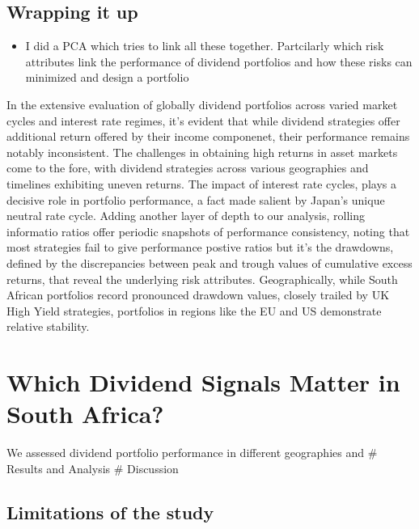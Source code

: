 \documentclass[11pt,preprint, authoryear]{elsarticle}
\numberwithin{equation}{section}
\numberwithin{figure}{section}
\numberwithin{table}{section}
\def\tightlist{} %
\begin{document}
\hypertarget{wrapping-it-up}{%
\subsection{Wrapping it up}\label{wrapping-it-up}}

\begin{itemize}
\tightlist
\item
  I did a PCA which tries to link all these together. Partcilarly which
  risk attributes link the performance of dividend portfolios and how
  these risks can minimized and design a portfolio
\end{itemize}

In the extensive evaluation of globally dividend portfolios across
varied market cycles and interest rate regimes, it's evident that while
dividend strategies offer additional return offered by their income
componenet, their performance remains notably inconsistent. The
challenges in obtaining high returns in asset markets come to the fore,
with dividend strategies across various geographies and timelines
exhibiting uneven returns. The impact of interest rate cycles, plays a
decisive role in portfolio performance, a fact made salient by Japan's
unique neutral rate cycle. Adding another layer of depth to our
analysis, rolling informatio ratios offer periodic snapshots of
performance consistency, noting that most strategies fail to give
performance postive ratios but it's the drawdowns, defined by the
discrepancies between peak and trough values of cumulative excess
returns, that reveal the underlying risk attributes. Geographically,
while South African portfolios record pronounced drawdown values,
closely trailed by UK High Yield strategies, portfolios in regions like
the EU and US demonstrate relative stability.

\hypertarget{which-dividend-signals-matter-in-south-africa}{%
\section{Which Dividend Signals Matter in South
Africa?}\label{which-dividend-signals-matter-in-south-africa}}

We assessed dividend portfolio performance in different geographies and
\# Results and Analysis \# Discussion

\hypertarget{limitations-of-the-study}{%
\subsection{Limitations of the study}\label{limitations-of-the-study}}
\end{document}
